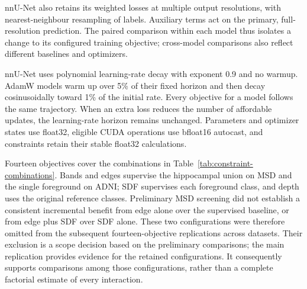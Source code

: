 \documentclass[12pt,a4paper]{article}
\begin{document}
nnU-Net also retains its weighted losses at multiple output resolutions,
with nearest-neighbour resampling of labels. Auxiliary terms act on
the primary, full-resolution prediction. The paired comparison within
each model thus isolates a change to its configured training objective;
cross-model comparisons also reflect different baselines and optimizers.

nnU-Net uses polynomial learning-rate decay with exponent 0.9 and no
warmup. AdamW models warm up over 5\% of their fixed horizon and then
decay cosinusoidally toward 1\% of the initial rate. Every objective
for a model follows the same trajectory. When an extra loss reduces
the number of affordable updates, the learning-rate horizon remains
unchanged. Parameters and optimizer states use float32, eligible CUDA
operations use bfloat16 autocast, and constraints retain their stable
float32 calculations.

Fourteen objectives cover the combinations in
Table~\ref{tab:constraint-combinations}. Bands and edges supervise
the hippocampal union on MSD and the single foreground on ADNI; SDF
supervises each foreground class, and depth
uses the original reference classes. Preliminary MSD screening did not
establish a consistent incremental benefit from edge alone over the
supervised baseline, or from edge plus SDF over SDF alone. These two
configurations were therefore omitted from the subsequent
fourteen-objective replications across datasets. Their exclusion is a
scope decision based on the preliminary comparisons; the main replication
provides evidence for the retained configurations. It consequently
supports comparisons among those configurations, rather than a complete
factorial estimate of every interaction.
\end{document}
